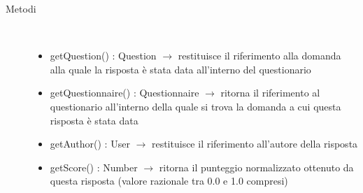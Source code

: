 \begin{description}
\item[Metodi] \hfill \\
\vspace{-7mm}
\begin{itemize}
	\item getQuestion() : Question $\rightarrow$ restituisce il riferimento alla domanda alla quale la risposta è stata data all'interno del questionario
	\item getQuestionnaire() : Questionnaire $\rightarrow$ ritorna il riferimento al questionario all'interno della quale si trova la domanda a cui questa risposta è stata data
	\item getAuthor() : User $\rightarrow$ restituisce il riferimento all'autore della risposta
	\item getScore() : Number $\rightarrow$ ritorna il punteggio normalizzato ottenuto da questa risposta (valore razionale tra 0.0 e 1.0 compresi)
\end{itemize}

\end{description}

\vspace{0.5cm}
